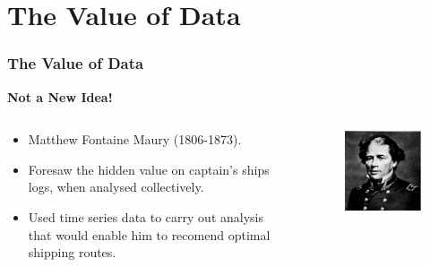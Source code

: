 \documentclass[hyperref={pdfpagelabels=true}]{beamer}
\begin{document}
\section{The Value of Data} 
\begin{frame}
\frametitle{The Value of Data}
\textbf{Not a New Idea!}
\begin{columns}
  \begin{column}{0.5\textwidth}  
    \begin{itemize}
      \item<1->Matthew Fontaine Maury (1806-1873).
      \item<2->Foresaw the hidden value on captain's ships logs, when analysed collectively.
      \item<2->Used time series data to carry out analysis that would enable him to recomend optimal shipping routes.%
      \end{itemize}
  \end{column}
  \begin{column}{0.5\textwidth}    
    \begin{figure}
    \includegraphics[scale=0.40]{maury.jpg}
    \end{figure}    
  \end{column}  
\end{columns}
\end{frame}

\end{document}
